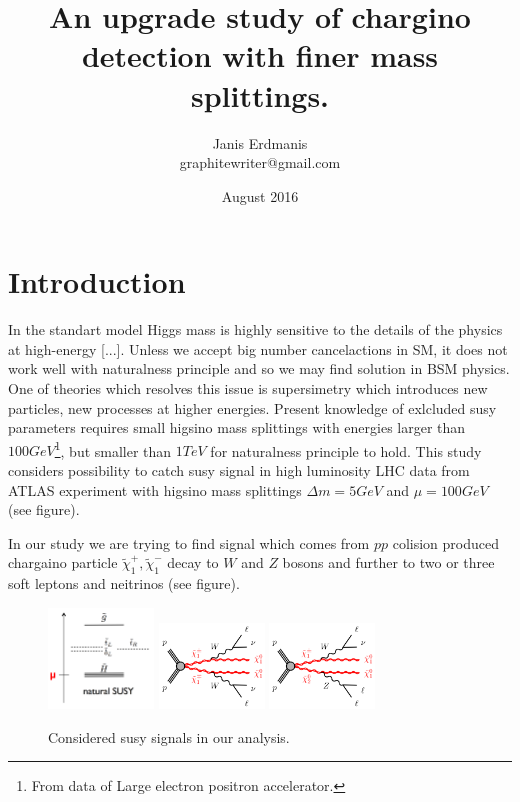 \documentclass[tightenline,notitlepage,nofootinbib]{revtex4-1}
\begin{document}
  \title{An upgrade study of chargino detection with finer mass splittings.}
  \author{Janis Erdmanis \\ graphitewriter@gmail.com}
  \date{August 2016}
  \maketitle

  \section{Introduction}

  In the standart model Higgs mass is highly sensitive to the details of the physics at high-energy [...]. Unless we accept big number cancelactions in SM, it does not work well with naturalness principle and so we may find solution in BSM physics. One of theories which resolves this issue is supersimetry which introduces new particles, new processes at higher energies. Present knowledge of exlcluded susy parameters requires small higsino mass splittings with energies larger than $100 GeV$\footnote{From data of Large electron positron accelerator.}, but smaller than $1 TeV$ for naturalness principle to hold. This study considers possibility to catch susy signal in high luminosity LHC data from ATLAS experiment with higsino mass splittings $\Delta m = 5 GeV$ and $\mu=100 GeV$ (see figure).

  In our study we are trying to find signal which comes from $pp$ colision produced chargaino particle $\tilde \chi_1^{+},\tilde \chi_1^{-}$ decay to $W$ and $Z$ bosons and further to two or three soft leptons and neitrinos (see figure).
  \begin{figure}[!ht]
    \centering
    \includegraphics[width=0.25\textwidth]{splittings.png}
    \includegraphics[width=0.25\textwidth]{C1C1.png}
    \includegraphics[width=0.25\textwidth]{C1N2.png}
    \caption{Considered susy signals in our analysis.}
  \end{figure}
\end{document}
